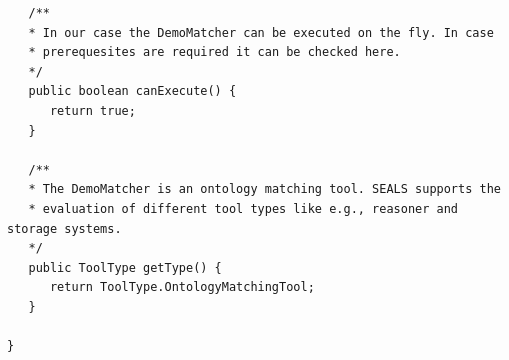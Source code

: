 \documentclass{article}
\begin{document}
\begin{verbatim}
   /**
   * In our case the DemoMatcher can be executed on the fly. In case
   * prerequesites are required it can be checked here. 
   */
   public boolean canExecute() {
      return true;
   }

   /**
   * The DemoMatcher is an ontology matching tool. SEALS supports the
   * evaluation of different tool types like e.g., reasoner and storage systems.
   */
   public ToolType getType() {
      return ToolType.OntologyMatchingTool;
   }
   
}
\end{verbatim}
\end{document}
